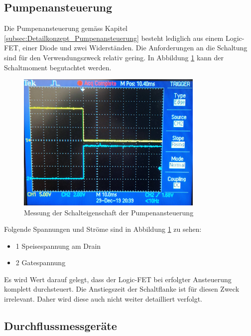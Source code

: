 \subsection{Pumpenansteuerung}\label{subsec:Hardware_Pumpenansteuerung}

Die Pumpenansteuerung gemäss Kapitel \ref{subsec:Detailkonzept_Pumpenansteuerung} besteht lediglich aus einem Logic-FET, einer Diode und zwei Widerständen. Die Anforderungen an die Schaltung sind für den Verwendungszweck relativ gering. In Abbildung \ref{fig:Schaltverhalten_Pumpen} kann der Schaltmoment begutachtet werden. 

\begin{figure}[h!]
	\centering
	\includegraphics[width=0.8\textwidth]{graphics/PumpenMessung.jpg}
	\caption{Messung der Schalteigenschaft der Pumpenansteuerung} 
	\label{fig:Schaltverhalten_Pumpen}
\end{figure}

Folgende Spannungen und Ströme sind in Abbildung \ref{fig:Schaltverhalten_Pumpen} zu sehen: 

\begin{itemize}
	\item 1 Speisespannung am Drain
	\item 2 Gatespannung 
\end{itemize}

Es wird Wert darauf gelegt, dass der Logic-FET bei erfolgter Ansteuerung komplett durchsteuert. Die Anstiegszeit der Schaltflanke ist für diesen Zweck irrelevant. Daher wird diese auch nicht weiter detailliert verfolgt. 

\subsection{Durchflussmessgeräte}\label{subsec:Hardware_Durchflussmessgeraete}

